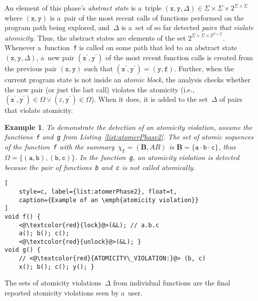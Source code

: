 \documentclass{ExcelAtFIT}
\theoremstyle{example}
\newtheorem{example}{Example}[section]
\begin{document}
An element of this phase's \emph{abstract state} is a~triple $ {(\mathtt{x}, \mathtt{y}, \Delta)} \in \Sigma \times \Sigma \times 2^{\Sigma \times \Sigma} $ where $ {(\mathtt{x}, \mathtt{y})} $ is a~pair of the most recent calls of functions performed on the program path being explored, and~$ \Delta $ is a~set of so far detected \emph{pairs that violate atomicity}. Thus, the abstract states are elements of the set $ 2^{\Sigma \times \Sigma \times 2^{\Sigma \times \Sigma}} $. Whenever a~function~\texttt{f} is called on some path that led to an abstract state ${ (\mathtt{x}, \mathtt{y}, \Delta) }$, a~new pair ${ (\mathtt{x}^\prime, \mathtt{y}^\prime) }$ of the most recent function calls is created from the previous pair ${ (\mathtt{x}, \mathtt{y}) }$ such that $ {(\mathtt{x}^\prime, \mathtt{y}^\prime)} = {(\mathtt{y}, \mathtt{f})} $. Further, when the current program state is not inside an \emph{atomic block}, the analysis checks whether the new pair (or just the last call) violates the atomicity (i.e., $ {(\mathtt{x}^\prime, \mathtt{y}^\prime)} \in \Omega \vee {(\varepsilon, \mathtt{y}^\prime)} \in \Omega $). When it does, it is added to the set~$ \Delta $ of pairs that violate atomicity.

\begin{example}
    \sloppy
    To demonstrate the detection of an atomicity violation, assume the functions~\texttt{f} and~\texttt{g} from Listing~\ref{list:atomerPhase2}. The set of atomic sequences of the function~\texttt{f} with the summary~$ \chi_\mathtt{f} = (\boldsymbol{B}, AB) $ is $ \boldsymbol{B} = \{\mathtt{a} \cdot \mathtt{b} \cdot \mathtt{c}\} $, thus $ \Omega = \{{(\mathtt{a, b})}, {(\mathtt{b, c})}\} $. In the function~\texttt{g}, an atomicity violation is detected because the pair of functions~\texttt{b} and~\texttt{c} is not called atomically.
\end{example}

\begin{lstlisting}[
    style=c, label={list:atomerPhase2}, float=t,
    caption={Example of an \emph{atomicity violation}}
]
void f() {
    <@\textcolor{red}{lock}@>(&L); // a.b.c
    a(); b(); c();
    <@\textcolor{red}{unlock}@>(&L); }
void g() {
    // <@\textcolor{red}{ATOMICITY\_VIOLATION:}@> (b, c)
    x(); b(); c(); y(); }
\end{lstlisting}

The sets of atomicity violations~$ \Delta $ from individual functions are the final reported atomicity violations seen by a~user.


\end{document}

